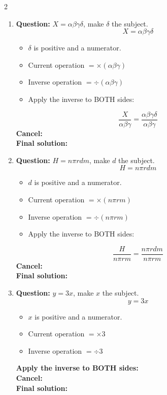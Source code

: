 \documentclass[11pt]{article}
\begin{document}
\begin{multicols}{2}
\begin{enumerate}[leftmargin=*, itemsep=10pt]
\columnbreak
\item \textbf{Question:} \( X = \alpha\beta\gamma\delta \), make \( \delta \) the subject.
\[
X=\alpha\beta\gamma\delta
\]
\begin{itemize}[leftmargin=*, itemsep=2pt]
\item \(\delta\) is positive and a numerator.
\item Current operation \(= \times (\alpha\beta\gamma)\)
\item Inverse operation \(= \div (\alpha\beta\gamma)\)
\item Apply the inverse to BOTH sides:
\end{itemize}
\[
\frac{X}{\alpha\beta\gamma}=\frac{\alpha\beta\gamma\delta}{\alpha\beta\gamma}
\]
\textbf{Cancel:} \\[1.5cm]
\textbf{Final solution:}\\[1.5cm]

\item \textbf{Question:} \( H = n\pi rdm \), make \( d \) the subject.
\[
H=n\pi rdm
\]
\begin{itemize}[leftmargin=*, itemsep=2pt]
\item \(d\) is positive and a numerator.
\item Current operation \(= \times (n\pi rm)\)
\item Inverse operation \(= \div (n\pi rm)\)
\item Apply the inverse to BOTH sides:
\end{itemize}
\[
\frac{H}{n\pi rm}=\frac{n\pi rdm}{n\pi rm}
\]
\textbf{Cancel:} \\[1.5cm]
\textbf{Final solution:}\\[1.5cm]

\columnbreak
\item \textbf{Question:} \( y = 3x \), make \( x \) the subject.
\[
y=3x
\]
\begin{itemize}[leftmargin=*, itemsep=2pt]
\item \(x\) is positive and a numerator.
\item Current operation \(= \times 3\)
\item Inverse operation \(= \div 3\)
\end{itemize}
\textbf{Apply the inverse to BOTH sides:} \\[1.5cm]
\textbf{Cancel:} \\[1.5cm]
\textbf{Final solution:}\\[1.5cm]


\end{enumerate}
\end{multicols}
\end{document}
